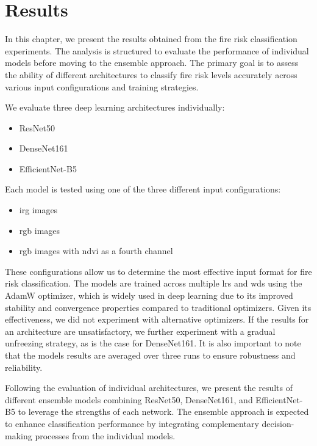 \chapter{Results}
\label{cha:results}

In this chapter, we present the results obtained from the fire risk classification 
experiments. The analysis is structured to evaluate the performance of individual 
models before moving to the ensemble approach. The primary goal is to assess the 
ability of different architectures to classify fire risk levels accurately across 
various input configurations and training strategies.

We evaluate three deep learning architectures individually:
\begin{itemize}
    \item ResNet50
    \item DenseNet161
    \item EfficientNet-B5
\end{itemize}

Each model is tested using one of the three different input configurations:
\begin{itemize}
    \item \gls{irg} images
    \item \gls{rgb} images
    \item \gls{rgb} images with \gls{ndvi} as a fourth channel
\end{itemize}

These configurations allow us to determine the most effective input format 
for fire risk classification. The models are trained across multiple \glspl{lr} and \glspl{wd} using 
the AdamW optimizer, which is widely used in 
deep learning due to its improved stability and convergence properties compared 
to traditional optimizers. Given its effectiveness, we did not experiment with 
alternative optimizers. If the results for an architecture are unsatisfactory, 
we further experiment with a gradual unfreezing strategy, as is the case for 
DenseNet161. It is also important to note that the models results are averaged
over three runs to ensure robustness and reliability.

Following the evaluation of individual architectures, we present the results of 
different ensemble models combining ResNet50, DenseNet161, and EfficientNet-B5 to 
leverage the strengths of each network. The ensemble approach is expected to enhance 
classification performance by integrating complementary decision-making processes 
from the individual models.

